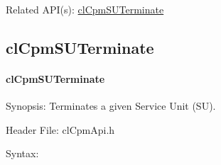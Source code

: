 {\begin{Desc}
\item[Related API(s):]\hyperlink{group__group14}{cl\-Cpm\-SUTerminate} \end{Desc}
\newpage



\subsection{clCpmSUTerminate}
\hypertarget{pagecpm134}{}\paragraph{cl\-Cpm\-SUTerminate}\label{pagecpm134}
\begin{Desc}
\item[Synopsis:]Terminates a given Service Unit (SU).\end{Desc}
\begin{Desc}
\item[Header File:]clCpmApi.h\end{Desc}
\begin{Desc}
\item[Syntax:]


\end{Desc}}
